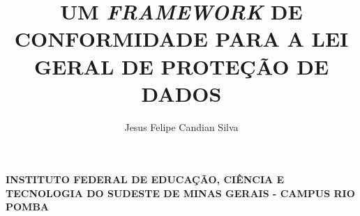 \documentclass[
	12pt,				%
	openright,			%
	oneside,			%
	a4paper,			%
	english,			%
	french,				%
	spanish,			%
	brazil,				%
	]{abntex2}
\author{Jesus Felipe Candian Silva}
\title{UM \textit{FRAMEWORK} DE CONFORMIDADE PARA A LEI GERAL DE PROTEÇÃO DE DADOS}
\begin{document}
\frenchspacing 


\begin{center}
\textbf{ 
INSTITUTO FEDERAL DE EDUCAÇÃO, CIÊNCIA E TECNOLOGIA DO SUDESTE DE MINAS GERAIS - CAMPUS RIO POMBA}
\end{center}

\imprimircapa

\imprimirfolhaderosto*

\end{document}
